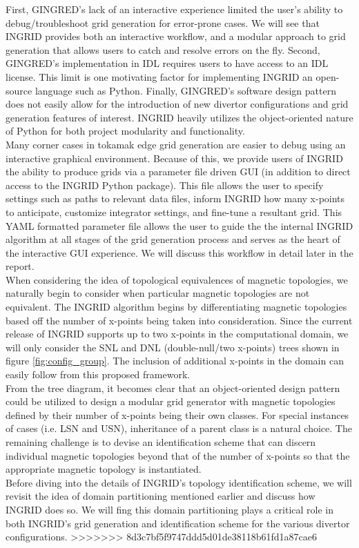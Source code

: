 \indent
First, GINGRED's lack of an interactive experience limited the user's ability to debug/troubleshoot grid generation for error-prone cases. We will see that INGRID provides both an interactive workflow, and a modular approach to grid generation that allows users to catch and resolve errors on the fly. Second, GINGRED's implementation in IDL requires users to have access to an IDL license. This limit is one motivating factor for implementing INGRID an open-source language such as Python. Finally, GINGRED's software design pattern does not easily allow for the introduction of new divertor configurations and grid generation features of interest. INGRID heavily utilizes the object-oriented nature of Python for both project modularity and functionality.\\ \indent
Many corner cases in tokamak edge grid generation are easier to debug using an interactive graphical environment. Because of this, we provide users of INGRID the ability to produce grids via a parameter file driven GUI (in addition to direct access to the INGRID Python package). This file allows the user to specify settings such as paths to relevant data files, inform INGRID how many x-points to anticipate, customize integrator settings, and fine-tune a resultant grid. This YAML formatted parameter file allows the user to guide the the internal INGRID algorithm at all stages of the grid generation process and serves as the heart of the interactive GUI experience. We will discuss this workflow in detail later in the report.\\
\indent
When considering the idea of topological equivalences of magnetic topologies, we naturally begin to consider when particular magnetic topologies are not equivalent. The INGRID algorithm begins by differentiating magnetic topologies based off the number of x-points being taken into consideration. Since the current release of INGRID supports up to two x-points in the computational domain, we will only consider the SNL and DNL (double-null/two x-points) trees shown in figure \ref{fig:config_group}. The inclusion of additional x-points in the domain can easily follow from this proposed framework. \\ \indent
From the tree diagram, it becomes clear that an object-oriented design pattern could be utilized to design a modular grid generator with magnetic topologies defined by their number of x-points being their own classes. For special instances of cases (i.e. LSN and USN), inheritance of a parent class is a natural choice. The remaining challenge is to devise an identification scheme that can discern individual magnetic topologies beyond that of the number of x-points so that the appropriate magnetic topology is instantiated.\\
Before diving into the details of INGRID's topology identification scheme, we will revisit the idea of domain partitioning mentioned earlier and discuss how INGRID does so. We will fing this domain partitioning plays a critical role in both INGRID's grid generation and identification scheme for the various divertor configurations.
>>>>>>> 8d3c7bf5f9747ddd5d01de38118b61fd1a87cae6
